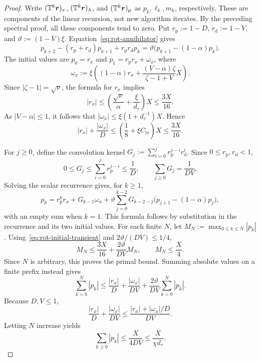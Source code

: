 \begin{proof}
Write \((\mathbb T^k\bm{r})_x\), \((\mathbb T^k\bm{r})_\lambda\), and
\((\mathbb T^k\bm{r})_\mu\) as \(p_k,\ell_k,m_k\), respectively.
These are components of the linear recursion, not new algorithm iterates.
By the preceding spectral proof, all these components tend to zero.
Put \(r_\mathrm{p}:=1-D\), \(r_\mathrm{d}:=1-V\), and
\(\vartheta:=(1-V)\xi\). Equation~\eqref{eq:rot-annihilator} gives
\[
p_{k+2}-(r_\mathrm{p}+r_\mathrm{d})p_{k+1}+r_\mathrm{p}r_\mathrm{d}p_k
=\vartheta\bigl(p_{k+1}-(1-\alpha)p_k\bigr).
\]
The initial values are \(p_0=r_x\) and
\(p_1=r_\mathrm{p}r_x+\omega_x\), where
\[
\omega_x:=\xi\left((1-\alpha)r_x+
\frac{(V-\alpha)\zeta}{\zeta-1+V}X\right).
\]
Since \(|\zeta-1|=\sqrt\nu\), the formula for \(r_x\) implies
\[
|r_x|\le\left(\frac{\sqrt\nu}{\alpha}+\frac\xi{d_\tau}\right)X
\le\frac{3X}{16}.
\]
As \(|V-\alpha|\le1\), it follows that
\(|\omega_x|\le\xi(1+d_\tau^{-1})X\). Hence
\begin{equation}
\label{eq:rot-initial-transient}
|r_x|+\frac{|\omega_x|}D
\le\left(\frac18+\xi C_\mathrm{tr}\right)X\le\frac{3X}{16}.
\end{equation}

For \(j\ge0\), define the convolution kernel
\(G_j:=\sum_{i=0}^jr_\mathrm{p}^{j-i}r_\mathrm{d}^i\).
Since \(0\le r_\mathrm{p},r_\mathrm{d}<1\),
\[
0\le G_j\le\sum_{i=0}^jr_\mathrm{p}^{j-i}\le\frac1D,
\qquad \sum_{j\ge0}G_j=\frac1{DV}.
\]
Solving the scalar recurrence gives, for \(k\ge1\),
\[
p_k=r_\mathrm{p}^kr_x+G_{k-1}\omega_x+
\vartheta\sum_{j=0}^{k-2}G_{k-2-j}\bigl(p_{j+1}-(1-\alpha)p_j\bigr),
\]
with an empty sum when \(k=1\). This formula follows by substitution
in the recurrence and its two initial values.
For each finite \(N\), let \(M_N:=\max_{0\le k\le N}|p_k|\).
Using~\eqref{eq:rot-initial-transient} and \(2\vartheta/(DV)\le1/4\),
\[
M_N\le\frac{3X}{16}+\frac{2\vartheta}{DV}M_N,
\qquad M_N\le\frac X4.
\]
Since \(N\) is arbitrary, this proves the primal bound.
Summing absolute values on a finite prefix instead gives
\[
\sum_{k=0}^N|p_k|
\le\frac{|r_x|}D+\frac{|\omega_x|}{DV}
+\frac{2\vartheta}{DV}\sum_{k=0}^N|p_k|.
\]
Because \(D,V\le1\),
\[
\frac{|r_x|}D+\frac{|\omega_x|}{DV}
\le\frac{|r_x|+|\omega_x|/D}{DV}.
\]
Letting \(N\) increase yields
\begin{equation}
\label{eq:rot-transient-sum}
\sum_{k\ge0}|p_k|\le\frac X{4DV}\le\frac X{\chi d_\tau}.
\end{equation}


\end{proof}
